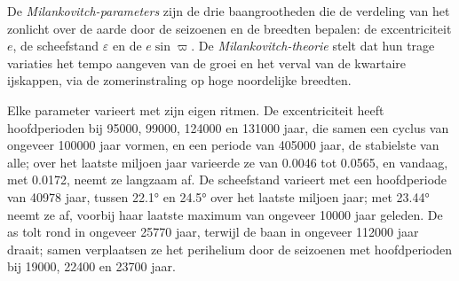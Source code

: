 \begin{definition}\label{def:b2:orbital-forcing:milankovitch}
De \emph{Milankovitch-parameters} zijn de drie
baangrootheden die de verdeling van het zonlicht over de aarde door de seizoenen en de
breedten bepalen: de excentriciteit $e$, de scheefstand $\varepsilon$ en de 
$e\sin\varpi$. De \emph{Milankovitch-theorie} stelt dat hun trage
variaties het tempo aangeven van de groei en het verval van de kwartaire ijskappen, via de zomerinstraling
op hoge noordelijke breedten.
\end{definition}

Elke parameter varieert met zijn eigen ritmen. De excentriciteit heeft hoofdperioden bij \num{95000},
\num{99000}, \num{124000} en \num{131000} jaar, die samen een cyclus van ongeveer
\num{100000} jaar vormen, en een periode van \num{405000} jaar, de stabielste van alle; over het laatste
miljoen jaar varieerde ze van \num{0.0046} tot \num{0.0565}, en vandaag, met \num{0.0172}, neemt ze langzaam
af. De scheefstand varieert met een hoofdperiode van \num{40978} jaar, tussen \ang{22.1} en
\ang{24.5} over het laatste miljoen jaar; met \ang{23.44} neemt ze af, voorbij haar laatste maximum van
ongeveer \num{10000} jaar geleden. De as tolt rond in ongeveer \num{25770} jaar, terwijl de
baan in ongeveer \num{112000} jaar draait; samen verplaatsen ze het perihelium door de seizoenen met
hoofdperioden bij \num{19000}, \num{22400} en \num{23700} jaar.

